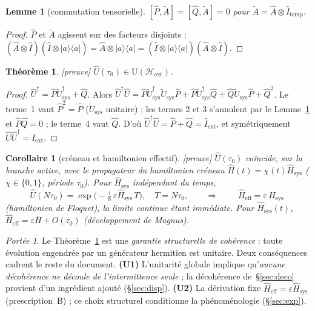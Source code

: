 \documentclass[11pt,a4paper]{article}
\newcommand{\ket}[1]{\lvert #1\rangle}
\newcommand{\bra}[1]{\langle #1\rvert}
\newcommand{\Hext}{\mathcal{H}_{\mathrm{ext}}}
\newcommand{\Hsysop}{\hat{H}_{\mathrm{sys}}}
\newcommand{\Heff}{\hat{H}_{\mathrm{eff}}}
\newcommand{\Iext}{\hat{I}_{\mathrm{ext}}}
\newcommand{\statut}[1]{{\footnotesize\textsf{[#1]}}}
\theoremstyle{plain}
\newtheorem{theorem}{Th\'eor\`eme}
\newtheorem{lemma}{Lemme}
\newtheorem{corollary}{Corollaire}
\theoremstyle{definition}
\theoremstyle{remark}
\newtheorem*{scope}{Port\'ee}
\begin{document}
\begin{lemma}[commutation tensorielle]\label{lem:comm}
$[\hat{P},\tilde{A}]=[\hat{Q},\tilde{A}]=0$ pour $\tilde{A}=\hat{A}\otimes\hat{I}_{\mathrm{temp}}$.
\end{lemma}
\begin{proof}
$\hat{P}$ et $\tilde A$ agissent sur des facteurs disjoints :
$(\hat A\otimes\hat I)(\hat I\otimes\ket{a}\bra{a})=\hat A\otimes\ket{a}\bra{a}
=(\hat I\otimes\ket{a}\bra{a})(\hat A\otimes\hat I)$.
\end{proof}

\begin{theorem}\label{thm:unit}\statut{preuve}
$\hat{U}(\tau_0)\in\mathrm{U}(\Hext)$.
\end{theorem}
\begin{proof}
$\hat{U}^\dagger=\hat{P}\tilde{U}_{\mathrm{sys}}^\dagger+\hat{Q}$. Alors
$\hat{U}^\dagger\hat{U}
=\hat{P}\tilde{U}_{\mathrm{sys}}^\dagger\tilde{U}_{\mathrm{sys}}\hat{P}
+\hat{P}\tilde{U}_{\mathrm{sys}}^\dagger\hat{Q}
+\hat{Q}\tilde{U}_{\mathrm{sys}}\hat{P}+\hat{Q}^2$.
Le terme~1 vaut $\hat P^2=\hat P$ ($\tilde U_{\mathrm{sys}}$ unitaire) ; les termes
2 et 3 s'annulent par le Lemme~\ref{lem:comm} et $\hat P\hat Q=0$ ; le terme~4 vaut
$\hat Q$. D'o\`u $\hat U^\dagger\hat U=\hat P+\hat Q=\Iext$, et sym\'etriquement
$\hat U\hat U^\dagger=\Iext$.
\end{proof}

\begin{corollary}[cr\'eneau et hamiltonien effectif]\label{cor:floquet}\statut{preuve}
$\hat U(\tau_0)$ co\"incide, sur la branche active, avec le propagateur du hamiltonien
cr\'eneau $\hat H(t)=\chi(t)\Hsysop$ ($\chi\in\{0,1\}$, p\'eriode $\tau_0$). Pour
$\Hsysop$ ind\'ependant du temps,
\[
\hat U(N\tau_0)=\exp\!\big(-\tfrac{i}{\hbar}\,\varepsilon\Hsysop\,T\big),
\quad T=N\tau_0,
\qquad\Longrightarrow\qquad
\boxed{\;\Heff=\varepsilon\,\Hsysop\;}
\]
(hamiltonien de Floquet), la limite continue \'etant imm\'ediate. Pour $\Hsysop(t)$,
$\Heff=\varepsilon\bar{H}+O(\tau_0)$ (d\'eveloppement de Magnus).
\end{corollary}

\begin{scope}
Le Th\'eor\`eme~\ref{thm:unit} est une \emph{garantie structurelle de coh\'erence} :
toute \'evolution engendr\'ee par un g\'en\'erateur hermitien est unitaire. Deux
cons\'equences cadrent le reste du document.
\textbf{(U1)} L'unitarit\'e globale implique qu'\emph{aucune d\'ecoh\'erence ne d\'ecoule de
l'intermittence seule} ; la d\'ecoh\'erence de~\S\ref{sec:deco} provient d'un ingr\'edient
ajout\'e (\S\ref{sec:disp}). \textbf{(U2)} La d\'erivation fixe
$\Heff=\varepsilon\Hsysop$ (prescription~B) ; ce choix structurel conditionne la
ph\'enom\'enologie (\S\ref{sec:exp}).
\end{scope}
\end{document}
